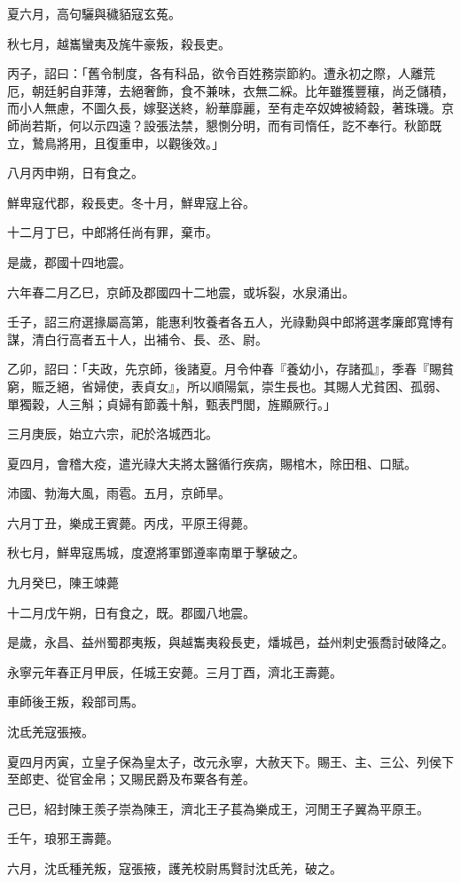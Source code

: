 \begin{pinyinscope}
夏六月，高句驪與穢貊寇玄菟。

秋七月，越巂蠻夷及旄牛豪叛，殺長吏。

丙子，詔曰：「舊令制度，各有科品，欲令百姓務崇節約。遭永初之際，人離荒厄，朝廷躬自菲薄，去絕奢飾，食不兼味，衣無二綵。比年雖獲豐穰，尚乏儲積，而小人無慮，不圖久長，嫁娶送終，紛華靡麗，至有走卒奴婢被綺縠，著珠璣。京師尚若斯，何以示四遠？設張法禁，懇惻分明，而有司惰任，訖不奉行。秋節既立，鷙鳥將用，且復重申，以觀後效。」

八月丙申朔，日有食之。

鮮卑寇代郡，殺長吏。冬十月，鮮卑寇上谷。

十二月丁巳，中郎將任尚有罪，棄市。

是歲，郡國十四地震。

六年春二月乙巳，京師及郡國四十二地震，或坼裂，水泉涌出。

壬子，詔三府選掾屬高第，能惠利牧養者各五人，光祿勳與中郎將選孝廉郎寬博有謀，清白行高者五十人，出補令、長、丞、尉。

乙卯，詔曰：「夫政，先京師，後諸夏。月令仲春『養幼小，存諸孤』，季春『賜貧窮，賑乏絕，省婦使，表貞女』，所以順陽氣，崇生長也。其賜人尤貧困、孤弱、單獨穀，人三斛；貞婦有節義十斛，甄表門閭，旌顯厥行。」

三月庚辰，始立六宗，祀於洛城西北。

夏四月，會稽大疫，遣光祿大夫將太醫循行疾病，賜棺木，除田租、口賦。

沛國、勃海大風，雨雹。五月，京師旱。

六月丁丑，樂成王賓薨。丙戌，平原王得薨。

秋七月，鮮卑寇馬城，度遼將軍鄧遵率南單于擊破之。

九月癸巳，陳王竦薨

十二月戊午朔，日有食之，既。郡國八地震。

是歲，永昌、益州蜀郡夷叛，與越雟夷殺長吏，燔城邑，益州刺史張喬討破降之。

永寧元年春正月甲辰，任城王安薨。三月丁酉，濟北王壽薨。

車師後王叛，殺部司馬。

沈氐羌寇張掖。

夏四月丙寅，立皇子保為皇太子，改元永寧，大赦天下。賜王、主、三公、列侯下至郎吏、從官金帛；又賜民爵及布粟各有差。

己巳，紹封陳王羨子崇為陳王，濟北王子萇為樂成王，河閒王子翼為平原王。

壬午，琅邪王壽薨。

六月，沈氐種羌叛，寇張掖，護羌校尉馬賢討沈氐羌，破之。


\end{pinyinscope}

